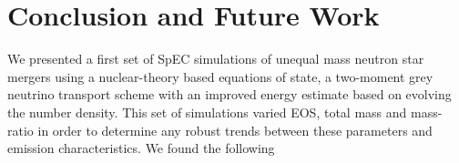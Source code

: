 





\section{Conclusion and Future Work}

We presented a first set of SpEC simulations of unequal mass neutron star mergers using a nuclear-theory based equations of state, a two-moment grey neutrino transport scheme with an improved energy estimate based on evolving the number density. This set of simulations varied EOS, total mass and mass-ratio in order to determine any robust trends between these parameters and emission characteristics. We found the following

